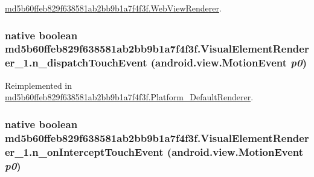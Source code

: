 \hyperlink{classmd5b60ffeb829f638581ab2bb9b1a7f4f3f_1_1_web_view_renderer_554c17e18aeffc2dcd3b9899551fd449}{md5b60ffeb829f638581ab2bb9b1a7f4f3f.WebViewRenderer}.\hypertarget{classmd5b60ffeb829f638581ab2bb9b1a7f4f3f_1_1_visual_element_renderer__1_ecca707bf9b175721aeea8b3018d9c9a}{
\subsubsection[{n\_\-dispatchTouchEvent}]{\setlength{\rightskip}{0pt plus 5cm}native boolean md5b60ffeb829f638581ab2bb9b1a7f4f3f.VisualElementRenderer\_\-1.n\_\-dispatchTouchEvent (android.view.MotionEvent {\em p0})}}
\label{classmd5b60ffeb829f638581ab2bb9b1a7f4f3f_1_1_visual_element_renderer__1_ecca707bf9b175721aeea8b3018d9c9a}




Reimplemented in \hyperlink{classmd5b60ffeb829f638581ab2bb9b1a7f4f3f_1_1_platform___default_renderer_099fc6dfc3ae7b6ee05e01cd5ae0716c}{md5b60ffeb829f638581ab2bb9b1a7f4f3f.Platform\_\-DefaultRenderer}.\hypertarget{classmd5b60ffeb829f638581ab2bb9b1a7f4f3f_1_1_visual_element_renderer__1_a5005d8febce3d07df2d375121e1b6ca}{
\subsubsection[{n\_\-onInterceptTouchEvent}]{\setlength{\rightskip}{0pt plus 5cm}native boolean md5b60ffeb829f638581ab2bb9b1a7f4f3f.VisualElementRenderer\_\-1.n\_\-onInterceptTouchEvent (android.view.MotionEvent {\em p0})}}
\label{classmd5b60ffeb829f638581ab2bb9b1a7f4f3f_1_1_visual_element_renderer__1_a5005d8febce3d07df2d375121e1b6ca}


